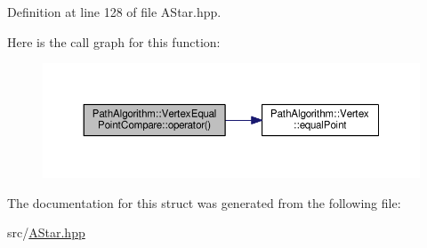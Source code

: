 Definition at line 128 of file A\+Star.\+hpp.



Here is the call graph for this function\+:\nopagebreak
\begin{figure}[H]
\begin{center}
\leavevmode
\includegraphics[width=350pt]{struct_path_algorithm_1_1_vertex_equal_point_compare_a3e17720ca1b633beb65c6f353145765d_cgraph}
\end{center}
\end{figure}




The documentation for this struct was generated from the following file\+:\begin{DoxyCompactItemize}
\item 
src/\hyperlink{_a_star_8hpp}{A\+Star.\+hpp}\end{DoxyCompactItemize}
